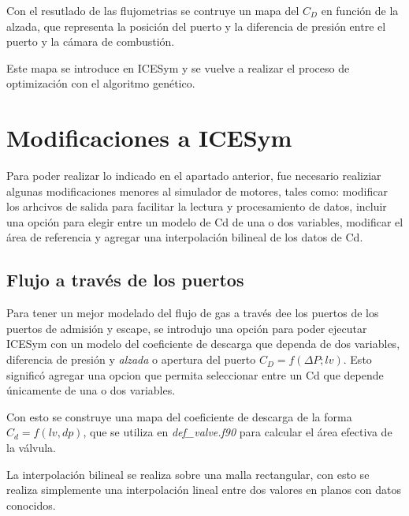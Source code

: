 Con el resutlado de las flujometrias se contruye un mapa del $C_D$ en función
de la alzada, que representa la posición del puerto y la diferencia de presión
entre el puerto y la cámara de combustión.

Este mapa se introduce en ICESym y se vuelve a realizar el proceso de optimización
con el algoritmo genético.

\section{Modificaciones a ICESym}
%
Para poder realizar lo indicado en el apartado anterior, fue necesario
realiziar algunas modificaciones menores al simulador de motores, tales como:
modificar los arhcivos de salida para facilitar la lectura y procesamiento de
datos, incluir una opción para elegir entre un modelo de Cd de una o dos
variables, modificar el área de referencia y  agregar una interpolación
bilineal de los datos de Cd.

\subsection{Flujo a través de los puertos}
%
Para tener un mejor modelado del flujo de gas a través dee los puertos de los
puertos de admisión y escape, se introdujo una opción para poder ejecutar
ICESym con un modelo del coeficiente de descarga que dependa de dos variables,
diferencia de presión y \emph{alzada} o apertura del puerto $C_D = f(\Delta P;
lv)$.
%
Esto significó agregar una opcion que permita seleccionar entre un Cd que
depende únicamente de una o dos variables.

Con esto se construye una mapa del coeficiente de descarga de la forma $C_d =
f(lv, dp)$, que se utiliza en \emph{def\_valve.f90} para calcular el área
efectiva de la válvula.

La interpolación bilineal se realiza sobre una malla rectangular, con esto se
realiza simplemente una interpolación lineal entre dos valores en planos con
datos conocidos.

